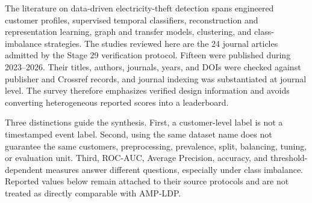 The literature on data-driven electricity-theft detection spans engineered customer profiles, supervised temporal classifiers, reconstruction and representation learning, graph and transfer models, clustering, and class-imbalance strategies. The studies reviewed here are the 24 journal articles admitted by the Stage 29 verification protocol. Fifteen were published during 2023--2026. Their titles, authors, journals, years, and DOIs were checked against publisher and Crossref records, and journal indexing was substantiated at journal level. The survey therefore emphasizes verified design information and avoids converting heterogeneous reported scores into a leaderboard.

Three distinctions guide the synthesis. First, a customer-level label is not a timestamped event label. Second, using the same dataset name does not guarantee the same customers, preprocessing, prevalence, split, balancing, tuning, or evaluation unit. Third, ROC-AUC, Average Precision, accuracy, and threshold-dependent measures answer different questions, especially under class imbalance. Reported values below remain attached to their source protocols and are not treated as directly comparable with AMP-LDP.
